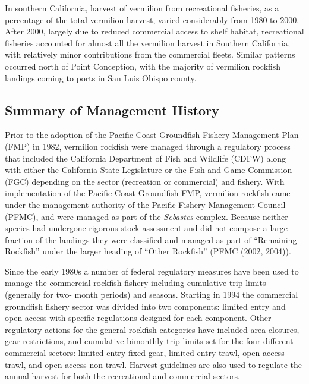 \documentclass[11pt,
  english,
  a4paper,
]{article}
\begin{document}
In southern California, harvest of vermilion from recreational fisheries, as a percentage of the total vermilion harvest, varied considerably from 1980 to 2000. After 2000, largely due to reduced commercial access to shelf habitat, recreational fisheries accounted for almost all the vermilion harvest in Southern California, with relatively minor contributions from the commercial fleets. Similar patterns occurred north of Point Conception, with the majority of vermilion rockfish landings coming to ports in San Luis Obispo county.


\hypertarget{summary-of-management-history}{%
\subsection{Summary of Management History}\label{summary-of-management-history}}

\leavevmode\tagmcend\tagstructend

Prior to the adoption of the Pacific Coast Groundfish Fishery Management Plan (FMP) in 1982, vermilion rockfish were managed through a regulatory process that included the California Department of Fish and Wildlife (CDFW) along with either the California State Legislature or the Fish and Game Commission (FGC) depending on the sector (recreation or commercial) and fishery. With implementation of the Pacific Coast Groundfish FMP, vermilion rockfish came under the management authority of the Pacific Fishery Management Council (PFMC), and were managed as part of the \emph{Sebastes} complex. Because neither species had undergone rigorous stock assessment and did not compose a large fraction of the landings they were classified and managed as part of ``Remaining Rockfish'' under the larger heading of ``Other Rockfish'' (PFMC {(2002, 2004)\leavevmode\tagmcend\tagstructend}).

Since the early 1980s a number of federal regulatory measures have been used to manage the commercial rockfish fishery including cumulative trip limits (generally for two- month periods) and seasons. Starting in 1994 the commercial groundfish fishery sector was divided into two components: limited entry and open access with specific regulations designed for each component. Other regulatory actions for the general rockfish categories have included area closures, gear restrictions, and cumulative bimonthly trip limits set for the four different commercial sectors: limited entry fixed gear, limited entry trawl, open access trawl, and open access non-trawl. Harvest guidelines are also used to regulate the annual harvest for both the recreational and commercial sectors.
\end{document}
